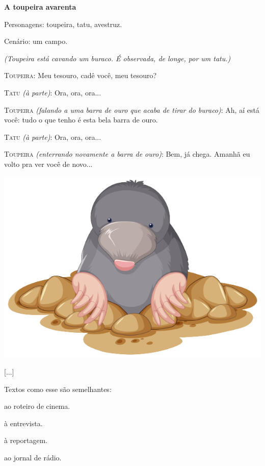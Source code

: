 \begin{myquote}
\textbf{A toupeira avarenta}

Personagens: toupeira, tatu, avestruz.

Cenário: um campo.

\textit{(Toupeira está cavando um buraco. É observada, de longe, por um tatu.)}

\textsc{Toupeira}: Meu tesouro, cadê você, meu tesouro?

\textsc{Tatu} \textit{(à parte)}: Ora, ora, ora...

\textsc{Toupeira} \textit{(falando a uma barra de ouro que acaba de tirar do
buraco)}: Ah, aí está você: tudo o que tenho é esta bela barra de ouro.

\textsc{Tatu} \textit{(à parte)}: Ora, ora, ora...

\textsc{Toupeira} \textit{(enterrando novamente a barra de ouro)}: Bem, já chega.
Amanhã eu volto pra ver você de novo...

\begin{center}
\noindent\includegraphics[width=.6\textwidth]{./media/image3c.png}
\end{center}

{[}...{]}

\end{myquote}

Textos como esse são semelhantes:

\begin{escolha}[itemsep=-5pt]
\item ao roteiro de cinema.

\item à entrevista.

\item à reportagem.

\item ao jornal de rádio.
\end{escolha}

